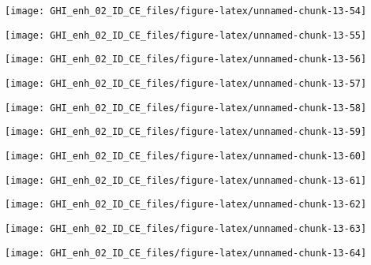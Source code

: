 \documentclass[
  10pt,
  a4paper,oneside]{article}
\begin{document}
\begin{center}\texttt{[image: GHI\_enh\_02\_ID\_CE\_files/figure-latex/unnamed-chunk-13-54]} \end{center}

\begin{center}\texttt{[image: GHI\_enh\_02\_ID\_CE\_files/figure-latex/unnamed-chunk-13-55]} \end{center}

\begin{center}\texttt{[image: GHI\_enh\_02\_ID\_CE\_files/figure-latex/unnamed-chunk-13-56]} \end{center}

\begin{center}\texttt{[image: GHI\_enh\_02\_ID\_CE\_files/figure-latex/unnamed-chunk-13-57]} \end{center}

\begin{center}\texttt{[image: GHI\_enh\_02\_ID\_CE\_files/figure-latex/unnamed-chunk-13-58]} \end{center}

\begin{center}\texttt{[image: GHI\_enh\_02\_ID\_CE\_files/figure-latex/unnamed-chunk-13-59]} \end{center}

\begin{center}\texttt{[image: GHI\_enh\_02\_ID\_CE\_files/figure-latex/unnamed-chunk-13-60]} \end{center}

\begin{center}\texttt{[image: GHI\_enh\_02\_ID\_CE\_files/figure-latex/unnamed-chunk-13-61]} \end{center}

\begin{center}\texttt{[image: GHI\_enh\_02\_ID\_CE\_files/figure-latex/unnamed-chunk-13-62]} \end{center}

\begin{center}\texttt{[image: GHI\_enh\_02\_ID\_CE\_files/figure-latex/unnamed-chunk-13-63]} \end{center}

\begin{center}\texttt{[image: GHI\_enh\_02\_ID\_CE\_files/figure-latex/unnamed-chunk-13-64]} \end{center}
\end{document}
